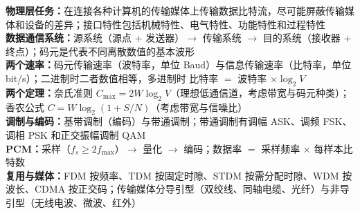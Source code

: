 \documentclass[a4paper,11pt]{article}
\begin{document}

\begin{knowmap}
\textbf{物理层任务：}在连接各种计算机的传输媒体上传输数据比特流，尽可能屏蔽传输媒体和设备的差异；接口特性包括机械特性、电气特性、功能特性和过程特性\\[2pt]
\textbf{数据通信系统：}源系统（源点 $+$ 发送器）$\rightarrow$ 传输系统 $\rightarrow$ 目的系统（接收器 $+$ 终点）；码元是代表不同离散数值的基本波形\\[2pt]
\textbf{两个速率：}码元传输速率（波特率，单位 Baud）与信息传输速率（比特率，单位 bit/s）；二进制时二者数值相等，多进制时 比特率 $=$ 波特率 $\times \log_2 V$\\[2pt]
\textbf{两个定理：}奈氏准则 $C_{\max}=2W\log_2 V$（理想低通信道，考虑带宽与码元种类）；香农公式 $C=W\log_2(1+S/N)$（考虑带宽与信噪比）\\[2pt]
\textbf{调制与编码：}基带调制（编码）与带通调制；带通调制有调幅 ASK、调频 FSK、调相 PSK 和正交振幅调制 QAM\\[2pt]
\textbf{PCM：}采样（$f_s\geq 2f_{\max}$）$\rightarrow$ 量化 $\rightarrow$ 编码；数据率 $=$ 采样频率 $\times$ 每样本比特数\\[2pt]
\textbf{复用与媒体：}FDM 按频率、TDM 按固定时隙、STDM 按需分配时隙、WDM 按波长、CDMA 按正交码；传输媒体分导引型（双绞线、同轴电缆、光纤）与非导引型（无线电波、微波、红外）
\end{knowmap}
\end{document}
